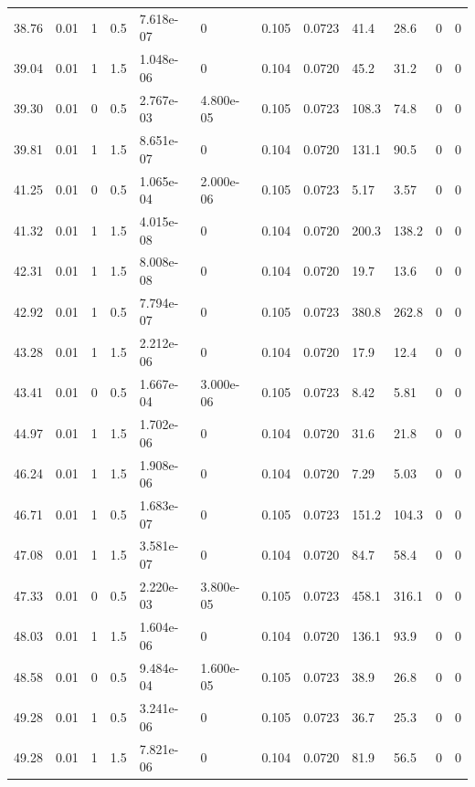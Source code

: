 \documentclass[preview]{standalone}
\begin{document}
{{{\begin{tabular}{L{1.2cm}C{1.2cm} C{0.3cm}C{0.5cm} C{1.4cm}C{1.4cm} C{1.4cm}C{1.4cm} C{1.6cm}C{1.6cm} C{1.6cm}C{1.6cm}}
  38.76  &  0.01  & 1     & 0.5 &  7.618e-07  & 0  &  0.105&   0.0723& 41.4 & 28.6   &  0 & 0  \\ 
  39.04  &  0.01  & 1     & 1.5 &  1.048e-06  & 0  &  0.104&   0.0720& 45.2 & 31.2   &  0 & 0  \\ 
  39.30  &  0.01  & 0     & 0.5 &  2.767e-03  & 4.800e-05  &  0.105&   0.0723& 108.3 & 74.8   &  0 & 0  \\ 
  39.81  &  0.01  & 1     & 1.5 &  8.651e-07  & 0  &  0.104&   0.0720& 131.1 & 90.5   &  0 & 0  \\ 
  41.25  &  0.01  & 0     & 0.5 &  1.065e-04  & 2.000e-06  &  0.105&   0.0723& 5.17 & 3.57   &  0 & 0  \\ 
  41.32  &  0.01  & 1     & 1.5 &  4.015e-08  & 0  &  0.104&   0.0720& 200.3 & 138.2   &  0 & 0  \\ 
  42.31  &  0.01  & 1     & 1.5 &  8.008e-08  & 0  &  0.104&   0.0720& 19.7 & 13.6   &  0 & 0  \\ 
  42.92  &  0.01  & 1     & 0.5 &  7.794e-07  & 0  &  0.105&   0.0723& 380.8 & 262.8   &  0 & 0  \\ 
  43.28  &  0.01  & 1     & 1.5 &  2.212e-06  & 0  &  0.104&   0.0720& 17.9 & 12.4   &  0 & 0  \\ 
  43.41  &  0.01  & 0     & 0.5 &  1.667e-04  & 3.000e-06  &  0.105&   0.0723& 8.42 & 5.81   &  0 & 0  \\ 
  44.97  &  0.01  & 1     & 1.5 &  1.702e-06  & 0  &  0.104&   0.0720& 31.6 & 21.8   &  0 & 0  \\ 
  46.24  &  0.01  & 1     & 1.5 &  1.908e-06  & 0  &  0.104&   0.0720& 7.29 & 5.03   &  0 & 0  \\ 
  46.71  &  0.01  & 1     & 0.5 &  1.683e-07  & 0  &  0.105&   0.0723& 151.2 & 104.3   &  0 & 0  \\ 
  47.08  &  0.01  & 1     & 1.5 &  3.581e-07  & 0  &  0.104&   0.0720& 84.7 & 58.4   &  0 & 0  \\ 
  47.33  &  0.01  & 0     & 0.5 &  2.220e-03  & 3.800e-05  &  0.105&   0.0723& 458.1 & 316.1   &  0 & 0  \\ 
  48.03  &  0.01  & 1     & 1.5 &  1.604e-06  & 0  &  0.104&   0.0720& 136.1 & 93.9   &  0 & 0  \\ 
  48.58  &  0.01  & 0     & 0.5 &  9.484e-04  & 1.600e-05  &  0.105&   0.0723& 38.9 & 26.8   &  0 & 0  \\ 
  49.28  &  0.01  & 1     & 0.5 &  3.241e-06  & 0  &  0.105&   0.0723& 36.7 & 25.3   &  0 & 0  \\ 
  49.28  &  0.01  & 1     & 1.5 &  7.821e-06  & 0  &  0.104&   0.0720& 81.9 & 56.5   &  0 & 0  \\ 

\end{tabular}}}}
\end{document}
